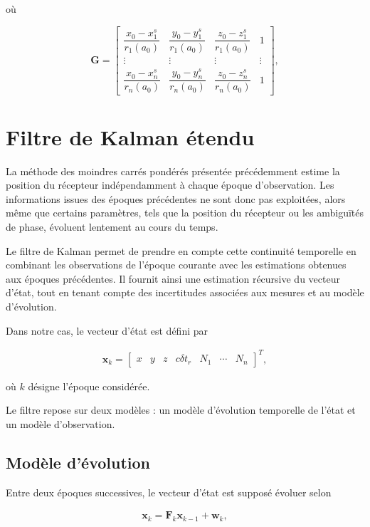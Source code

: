 où

\[
\mathbf G=
\begin{bmatrix}
\dfrac{x_0-x_1^s}{r_1(a_0)} &
\dfrac{y_0-y_1^s}{r_1(a_0)} &
\dfrac{z_0-z_1^s}{r_1(a_0)} &
1\\
\vdots & \vdots & \vdots & \vdots\\
\dfrac{x_0-x_n^s}{r_n(a_0)} &
\dfrac{y_0-y_n^s}{r_n(a_0)} &
\dfrac{z_0-z_n^s}{r_n(a_0)} &
1
\end{bmatrix},
\]


\section{Filtre de Kalman étendu} \label{Kalman}

La méthode des moindres carrés pondérés présentée précédemment estime la position du récepteur indépendamment à chaque époque d'observation. Les informations issues des époques précédentes ne sont donc pas exploitées, alors même que certains paramètres, tels que la position du récepteur ou les ambiguïtés de phase, évoluent lentement au cours du temps.

Le filtre de Kalman permet de prendre en compte cette continuité temporelle en combinant les observations de l'époque courante avec les estimations obtenues aux époques précédentes. Il fournit ainsi une estimation récursive du vecteur d'état, tout en tenant compte des incertitudes associées aux mesures et au modèle d'évolution.

Dans notre cas, le vecteur d'état est défini par

\begin{align}
\mathbf{x}_k=
\begin{bmatrix}
x &
y &
z &
c\delta t_r &
N_1 &
\cdots &
N_n
\end{bmatrix}^{T},
\end{align}

où $k$ désigne l'époque considérée.

Le filtre repose sur deux modèles : un modèle d'évolution temporelle de l'état et un modèle d'observation.

\subsection{Modèle d'évolution}

Entre deux époques successives, le vecteur d'état est supposé évoluer selon

\begin{align}
\mathbf{x}_k
=
\mathbf{F}_k
\mathbf{x}_{k-1}
+
\mathbf{w}_k,
\label{eq:kalman_prediction}
\end{align}

